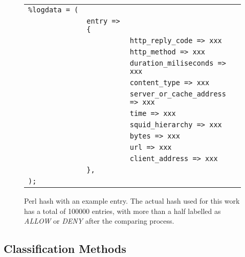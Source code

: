 \documentclass{llncs}
\begin{document}
\begin{figure}[htb]
\centering
\begin{tabular}{ p{0.1cm} p{0.1cm} p{6cm} }
  \texttt{\%logdata~=~(} & & \\
   & \texttt{entry~=>\{} & \\
   & & \texttt{http\_reply\_code => xxx} \\
   & & \texttt{http\_method => xxx} \\
   & & \texttt{duration\_miliseconds => xxx} \\
   & & \texttt{content\_type => xxx} \\
   & & \texttt{server\_or\_cache\_address => xxx} \\
   & & \texttt{time => xxx} \\
   & & \texttt{squid\_hierarchy => xxx} \\
   & & \texttt{bytes => xxx} \\
   & & \texttt{url => xxx} \\
   & & \texttt{client\_address => xxx} \\
   & \texttt{\},} & \\
  \texttt{);} & & \\
\end{tabular}
\caption{Perl hash with an example entry. The actual hash used for this work has a total of 100000 entries, with more than a half labelled as \textit{ALLOW} or \textit{DENY} after the comparing process. \label{fig:data_hash}}
\end{figure}

%
\subsection{Classification Methods}
\label{subsec:methods}

\end{document}
